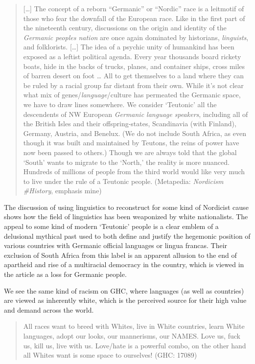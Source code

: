 \documentclass[output=paper,colorlinks,citecolor=brown]{langscibook}
\begin{document}
\begin{quote} 
{[}\ldots{]} The concept of a reborn ``Germanic'' or ``Nordic'' race is a leitmotif of those who fear the downfall of the European race. Like in the first part of the nineteenth century, discussions on the origin and identity of the \emph{Germanic peoples nation} are once again dominated by historians, \emph{linguists}, and folklorists. {[}\ldots{]} The idea of a psychic unity of humankind has been exposed as a leftist political agenda. Every year thousands board rickety boats, hide in the backs of trucks, planes, and container ships, cross miles of barren desert on foot \ldots{} All to get themselves to a land where they can be ruled by a racial group far distant from their own. While it's not clear what mix of genes\slash\emph{language}\slash culture has permeated the Germanic space, we have to draw lines somewhere. We consider `Teutonic' all the descendents of NW European \emph{Germanic language speakers}, including all of the British Isles and their offspring-states, Scandinavia (with Finland), Germany, Austria, and Benelux. (We do not include South Africa, as even though it was built and maintained by Teutons, the reins of power have now been passed to others.) Though we are always told that the global `South' wants to migrate to the `North,' the reality is more nuanced. Hundreds of millions of people from the third world would like very much to live under the rule of a Teutonic people. (Metapedia: \emph{Nordicism \#History}, emphasis mine)
\end{quote}

The discussion of using linguistics to reconstruct  for some kind of Nordicist cause shows how the field of linguistics has been weaponized by white nationalists. The appeal to some kind of modern `Teutonic' people is a clear emblem of a delusional mythical past used to both define and justify the hegemonic position of various countries with Germanic official languages or lingua francas. Their exclusion of South Africa from this label is an apparent allusion to the end of apartheid and rise of a multiracial democracy in the country, which is viewed in the article as a loss for Germanic people.

We see the same kind of racism on GHC, where languages (as well as countries) are viewed as inherently white, which is the perceived source for their high value and demand across the world.

\begin{quote}
All races want to breed with Whites, live in White countries, learn White languages, adopt our looks, our mannerisms, our NAMES. Love us, fuck us, kill us, live with us. Love\slash hate is a powerful combo, on the other hand all Whites want is some space to ourselves! (GHC: 17089) 
\end{quote}
\end{document}
